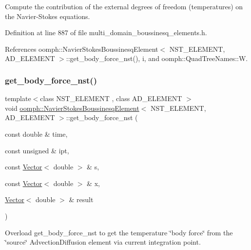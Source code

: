 Compute the contribution of the external degrees of freedom (temperatures) on the Navier-\/\+Stokes equations. 



Definition at line 887 of file multi\+\_\+domain\+\_\+boussinesq\+\_\+elements.\+h.



References oomph\+::\+Navier\+Stokes\+Boussinesq\+Element$<$ N\+S\+T\+\_\+\+E\+L\+E\+M\+E\+N\+T, A\+D\+\_\+\+E\+L\+E\+M\+E\+N\+T $>$\+::get\+\_\+body\+\_\+force\+\_\+nst(), i, and oomph\+::\+Quad\+Tree\+Names\+::W.

\mbox{\label{classoomph_1_1NavierStokesBoussinesqElement_a2ff5be3155df975541a25444d43c1ca8}} 
\subsubsection{\texorpdfstring{get\+\_\+body\+\_\+force\+\_\+nst()}{get\_body\_force\_nst()}}
{\footnotesize\ttfamily template$<$class N\+S\+T\+\_\+\+E\+L\+E\+M\+E\+NT , class A\+D\+\_\+\+E\+L\+E\+M\+E\+NT $>$ \\
void \hyperlink{classoomph_1_1NavierStokesBoussinesqElement}{oomph\+::\+Navier\+Stokes\+Boussinesq\+Element}$<$ N\+S\+T\+\_\+\+E\+L\+E\+M\+E\+NT, A\+D\+\_\+\+E\+L\+E\+M\+E\+NT $>$\+::get\+\_\+body\+\_\+force\+\_\+nst (\begin{DoxyParamCaption}\item[{const double \&}]{time,  }\item[{const unsigned \&}]{ipt,  }\item[{const \hyperlink{classoomph_1_1Vector}{Vector}$<$ double $>$ \&}]{s,  }\item[{const \hyperlink{classoomph_1_1Vector}{Vector}$<$ double $>$ \&}]{x,  }\item[{\hyperlink{classoomph_1_1Vector}{Vector}$<$ double $>$ \&}]{result }\end{DoxyParamCaption})}



Overload get\+\_\+body\+\_\+force\+\_\+nst to get the temperature \char`\"{}body force\char`\"{} from the \char`\"{}source\char`\"{} Advection\+Diffusion element via current integration point. 

